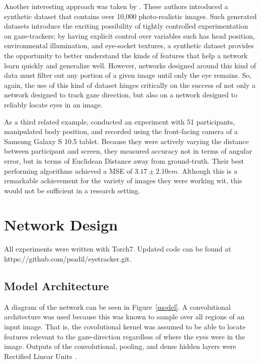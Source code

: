 \documentclass[10pt,letterpaper]{article}
\begin{document}
Another interesting approach was taken by . These authors introduced a synthetic dataset that contains over 10,000 photo-realistic images. Such generated datasets introduce the exciting possibility of tightly controlled experimentation on gaze-trackers; by having explicit control over variables such has head position, environmental illumination, and eye-socket textures, a synthetic dataset provides the opportunity to better understand the kinds of features that help a network learn quickly and generalize well. However, networks designed around this kind of data must filter out any portion of a given image until only the eye remains. So, again, the use of this kind of dataset hinges critically on the success of not only a network designed to track gaze direction, but also on a network designed to reliably locate eyes in an image. 

As a third related example,  conducted an experiment with 51 participants, manipulated body position, and recorded using the front-facing camera of a Samsung Galaxy S 10.5 tablet. Because they were actively varying the distance between participant and screen, they measured accuracy not in terms of angular error, but in terms of Euclidean Distance away from ground-truth. Their best performing algorithms achieved a MSE of $3.17 \pm 2.10 cm$. Although this is a remarkable achievement for the variety of images they were working wit, this would not be sufficient in a research setting.

\section{Network Design}

All experiments were written with Torch7. Updated code can be found at https://github.com/psadil/eyetracker.git. 

\subsection{Model Architecture}

A diagram of the network can be seen in Figure~\ref{model}. A convolutional architecture \cite{lecun1998gradient} was used because this was known to sample over all regions of an input image. That is, the covolutional kernel was assumed to be able to locate features relevant to the gaze-direction regardless of where the eyes were in the image. Outputs of the convolutional, pooling, and dense hidden layers were Rectified Linear Units \cite{glorot2011deep}. 
\end{document}
